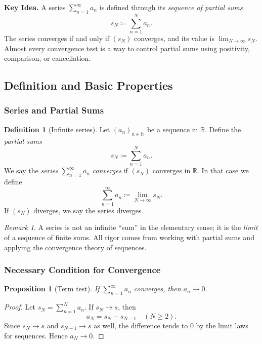 \documentclass[12pt]{article}
\numberwithin{equation}{section}
\newcommand{\RR}{\mathbb{R}}
\newcommand{\NN}{\mathbb{N}}
\theoremstyle{plain}
\newtheorem{proposition}[theorem]{Proposition}
\theoremstyle{definition}
\newtheorem{definition}[theorem]{Definition}
\theoremstyle{remark}
\newtheorem{remark}[theorem]{Remark}
\newenvironment{keyidea}{\begin{tcolorbox}\textbf{Key Idea.}}{\end{tcolorbox}}
\begin{document}
\begin{keyidea}
A series $\sum_{n=1}^\infty a_n$ is defined through its \emph{sequence of partial sums}
\[
s_N \coloneqq \sum_{n=1}^{N} a_n.
\]
The series converges if and only if $(s_N)$ converges, and its value is $\lim_{N\to\infty}s_N$.
Almost every convergence test is a way to control partial sums using positivity, comparison, or cancellation.
\end{keyidea}

\subsection{Definition and Basic Properties}

\subsubsection{Series and Partial Sums}

\begin{definition}[Infinite series]\label{def:series}
Let $(a_n)_{n\in\NN}$ be a sequence in $\RR$. Define the \emph{partial sums}
\[
s_N \coloneqq \sum_{n=1}^{N} a_n.
\]
We say the \emph{series} $\sum_{n=1}^{\infty} a_n$ \emph{converges} if $(s_N)$ converges in $\RR$.
In that case we define
\[
\sum_{n=1}^{\infty} a_n \coloneqq \lim_{N\to\infty} s_N.
\]
If $(s_N)$ diverges, we say the series diverges.
\end{definition}

\begin{remark}
A series is not an infinite “sum” in the elementary sense; it is the \emph{limit} of a sequence of finite sums.
All rigor comes from working with partial sums and applying the convergence theory of sequences.
\end{remark}

\subsubsection{Necessary Condition for Convergence}

\begin{proposition}[Term test]\label{prop:term-test}
If $\sum_{n=1}^{\infty} a_n$ converges, then $a_n\to 0$.
\end{proposition}

\begin{proof}
Let $s_N=\sum_{n=1}^{N}a_n$. If $s_N\to s$, then
\[
a_N = s_N - s_{N-1}\quad (N\ge 2).
\]
Since $s_N\to s$ and $s_{N-1}\to s$ as well, the difference tends to $0$ by the limit laws for sequences. Hence $a_N\to 0$.
\end{proof}
\end{document}
